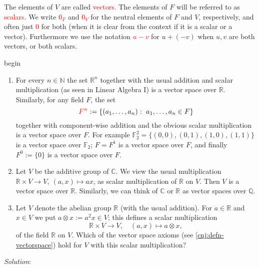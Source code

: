 \documentclass[
  12pt,
  a4paper,
  twoside]{article}
\theoremstyle{plain}
\theoremstyle{definition}
\begin{document}
The elements of \(V\) are called \textcolor{red}{vectors}. The elements of \(F\) will be referred to as \textcolor{red}{scalars}. We write \textcolor{red}{$0_F$} and \textcolor{red}{$0_{V}$} for the neutral elements of \(F\) and \(V\), respectively, and often just \textcolor{red}{$0$} for both (when it is clear from the context if it is a scalar or a vector). Furthermore we use the notation \textcolor{red}{$u-v$} for \(u + (-v)\) when \(u,v\) are both vectors, or both scalars.

\csname begin\label{cnj:expl-vectspaces}

\begin{enumerate}
\def\labelenumi{(\alph{enumi})}
\item
  For every \(n \in \mathbb{N}\) the set \(\mathbb{R}^{n}\) together with the usual addition and scalar multiplication (as seen in Linear Algebra I) is a vector space over \(\mathbb{R}\).
  Similarly, for any field \(F\), the set \[ {\color{red}{F^n}} := \{ (a_{1}, \dots ,a_{n}) : \ a_{1}, \dots ,a_{n} \in F \} \] together with component-wise addition and the obvious scalar multiplication is a vector space over \(F\).
  For example \(\mathbb{F}_{2}^{2} = \{ (0,0),(0,1),(1,0),(1,1) \}\) is a vector space over \(\mathbb{F}_{2}\);
  \(F=F^{1}\) is a vector space over \(F\), and finally \(F^0:=\{ 0 \}\) is a vector space over \(F\).
\item
  Let \(V\) be the additive group of \(\mathbb{C}\).
  We view the usual multiplication \(\mathbb{R} \times V \to V, \ (a,x) \mapsto ax\), as scalar multiplication of \(\mathbb{R}\) on \(V\).
  Then \(V\) is a vector space over \(\mathbb{R}\). Similarly, we can think of \(\mathbb{C}\) or \(\mathbb{R}\) as vector spaces over \(\mathbb{Q}\).
\item
  Let \(V\) denote the abelian group \(\mathbb{R}\) (with the usual addition).
  For \(a \in \mathbb{R}\) and \(x \in V\) we put \(a \otimes x := a^{2}x \in V\); this defines a scalar multiplication \[ \mathbb{R} \times V \to V,\quad (a,x) \mapsto a \otimes x, \] of the field \(\mathbb{R}\) on \(V\).
  Which of the vector space axioms (see \ref{cnj:defn-vectorspace}) hold for \(V\) with this scalar multiplication?
\end{enumerate}

\emph{Solution}:
\end{document}
